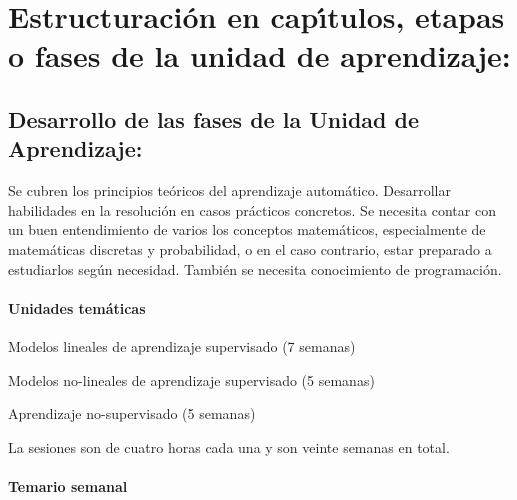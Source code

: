 \section{Estructuraci\'{o}n en cap\'{\i}tulos, etapas o fases de la unidad de
  aprendizaje:}

\subsection{Desarrollo de las fases de la Unidad de Aprendizaje:}

\quad

Se cubren los principios te\'{o}ricos del aprendizaje
autom\'{a}tico. Desarrollar habilidades en la resoluci\'{o}n en casos
pr\'{a}cticos concretos. Se necesita contar con un buen entendimiento
de varios los conceptos matem\'{a}ticos, especialmente de
matem\'{a}ticas discretas y probabilidad, o en el caso contrario,
estar preparado a estudiarlos seg\'{u}n necesidad. Tambi\'{e}n se
necesita conocimiento de programaci\'{o}n.

\paragraph{Unidades tem\'{a}ticas}

\begin{description}[itemsep=-3pt]
\item[U1]{Modelos lineales de aprendizaje supervisado (7 semanas)}
\item[U2]{Modelos no-lineales de aprendizaje supervisado (5 semanas)}
\item[U3]{Aprendizaje no-supervisado (5 semanas)}  
\end{description}

La sesiones son de cuatro horas cada una y son veinte semanas en
total.

\newpage

\paragraph{Temario semanal}

